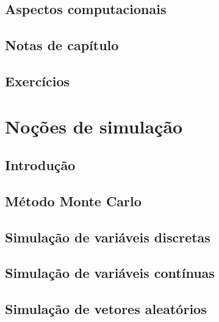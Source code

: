 \documentclass[
]{latex/krantz}
\theoremstyle{definition}
\theoremstyle{definition}
\theoremstyle{definition}
\theoremstyle{definition}
\theoremstyle{remark}
\begin{document}
\hypertarget{aspectos-computacionais}{%
\section{Aspectos computacionais}\label{aspectos-computacionais}}

\hypertarget{notas-de-capuxedtulo-13}{%
\section{Notas de capítulo}\label{notas-de-capuxedtulo-13}}

\hypertarget{exercuxedcios-13}{%
\section{Exercícios}\label{exercuxedcios-13}}

\hypertarget{nouxe7uxf5es-de-simulauxe7uxe3o}{%
\chapter{Noções de simulação}\label{nouxe7uxf5es-de-simulauxe7uxe3o}}

\hypertarget{introduuxe7uxe3o-14}{%
\section{Introdução}\label{introduuxe7uxe3o-14}}

\hypertarget{muxe9todo-monte-carlo}{%
\section{Método Monte Carlo}\label{muxe9todo-monte-carlo}}

\hypertarget{simulauxe7uxe3o-de-variuxe1veis-discretas}{%
\section{Simulação de variáveis discretas}\label{simulauxe7uxe3o-de-variuxe1veis-discretas}}

\hypertarget{simulauxe7uxe3o-de-variuxe1veis-contuxednuas}{%
\section{Simulação de variáveis contínuas}\label{simulauxe7uxe3o-de-variuxe1veis-contuxednuas}}

\hypertarget{simulauxe7uxe3o-de-vetores-aleatuxf3rios}{%
\section{Simulação de vetores aleatórios}\label{simulauxe7uxe3o-de-vetores-aleatuxf3rios}}
\end{document}
